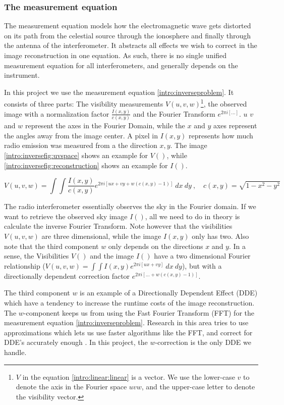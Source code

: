 \subsubsection{The measurement equation}
The measurement equation models how the electromagnetic wave gets distorted on its path from the celestial source through the ionosphere and finally through the antenna of the interferometer\cite{smirnov2011revisiting1}. It abstracts all effects we wish to correct in the image reconstruction in one equation. As such, there is no single unified measurement equation for all interferometers, and generally depends on the instrument.

In this project we use the measurement equation \eqref{intro:inverseproblem}. It consists of three parts: The visibility measurements $V(u,v,w)$\footnote{$V$ in the equation \eqref{intro:linear:linear} is a vector. We use the lower-case $v$ to denote the axis in the Fourier space $uvw$, and the upper-case letter to denote the visibility vector.}, the observed image with a normalization factor $\frac{I(x, y)}{c(x, y)}$ and the Fourier Transform $e^{2 \pi i [\ldots]}$. $u$ $v$ and $w$ represent the axes in the Fourier Domain, while the $x$ and $y$ axes represent the angles away from the image center. A pixel in $I(x,y)$ represents how much radio emission was measured from a the direction $x,y$. The image \ref{intro:inversefig:uvspace} shows an example for $V()$, while \ref{intro:inversefig:reconstruction} shows an example for $I()$.

\begin{equation}\label{intro:inverseproblem}
V(u, v, w) = \int\int  \frac{I(x, y)}{c(x, y)}  e^{2 \pi i [ux+vy+ w(c(x, y) - 1)]} \: dx \: dy \:,  \quad c(x,y) = \sqrt{1 - x^2 - y ^2}
\end{equation}

The radio interferometer essentially observes the sky in the Fourier domain. If we want to retrieve the observed sky image $I()$, all we need to do in theory is calculate the inverse Fourier Transform. Note however that the visibilities $V(u,v,w)$ are three dimensional, while the image $I(x,y)$ only has two. Also note that the third component $w$ only depends on the directions $x$ and $y$. In a sense, the Visibilities $V()$ and the image $I()$ have a two dimensional Fourier relationship ($V(u,v,w) = \int\int I(x,y) e^{2 \pi i [ux+vy]} \: dx \: dy$), but with a directionally dependent correction factor $e^{2 \pi i [\ldots +w(c(x, y) - 1)]}$. 

The third component $w$ is an example of a Directionally Dependent Effect (DDE) which have a tendency to increase the runtime costs of the image reconstruction. The $w$-component keeps us from using the Fast Fourier Transform (FFT) for the measurement equation \eqref{intro:inverseproblem}. Research in this area tries to use approximations which lets us use faster algorithms like the FFT, and correct for DDE's accurately enough \cite{veenboer2017image, offringa2014wsclean, pratley2018fast}. In this project, the $w$-correction is the only DDE we handle.


